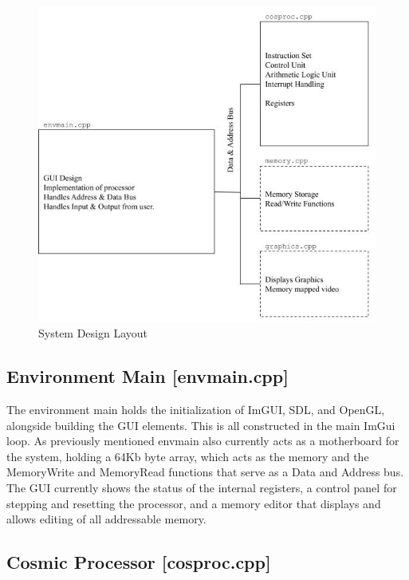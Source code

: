 \documentclass[conference]{IEEEtran}
\begin{document}
\begin{figure}[h!]
	\includegraphics[width=\linewidth]{SystemDesign.jpg}
	\caption{System Design Layout}
	\label{fig:System Design Layout}
\end{figure}



\subsection{Environment Main [envmain.cpp]}

The environment main holds the initialization of ImGUI, SDL, and OpenGL, alongside building the GUI elements. This is all constructed in the main ImGui loop. As previously mentioned envmain also currently acts as a motherboard for the system, holding a 64Kb byte array, which acts as the memory and the MemoryWrite and MemoryRead functions that serve as a Data and Address bus. The GUI currently shows the status of the internal registers, a control panel for stepping and resetting the processor, and a memory editor that displays and allows editing of all addressable memory. 


\subsection{Cosmic Processor [cosproc.cpp]}
\end{document}
